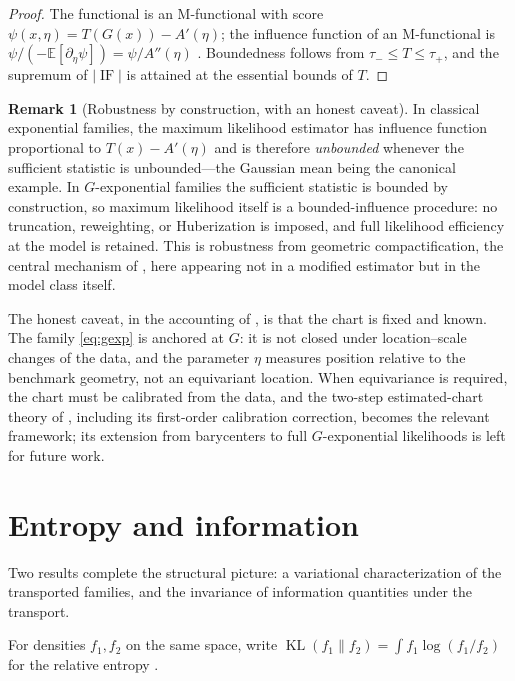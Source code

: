 \documentclass[11pt]{article}
\theoremstyle{definition}
\newtheorem{remark}[theorem]{Remark}
\newcommand{\E}{\mathbb{E}}
\newcommand{\KL}{\operatorname{KL}}
\newcommand{\IF}{\operatorname{IF}}
\begin{document}
\begin{proof}
The functional is an M-functional with score
$\psi(x,\eta)=T(G(x))-A'(\eta)$; the influence function of an M-functional
is $\psi/(-\E[\partial_\eta\psi])=\psi/A''(\eta)$
\cite{HampelEtAl1986,Huber2009}. Boundedness follows from
$\tau_-\le T\le\tau_+$, and the supremum of $|\IF|$ is attained at the
essential bounds of $T$.
\end{proof}

\begin{remark}[Robustness by construction, with an honest caveat]
\label{rem:robustness}
In classical exponential families, the maximum likelihood estimator has
influence function proportional to $T(x)-A'(\eta)$ and is therefore
\emph{unbounded} whenever the sufficient statistic is unbounded---the
Gaussian mean being the canonical example. In $G$-exponential families the
sufficient statistic is bounded by construction, so maximum likelihood
itself is a bounded-influence procedure: no truncation, reweighting, or
Huberization is imposed, and full likelihood efficiency at the model is
retained. This is robustness from geometric compactification, the central
mechanism of \cite{Cojocea2026b}, here appearing not in a modified
estimator but in the model class itself.

The honest caveat, in the accounting of \cite{Cojocea2026b}, is that the
chart is fixed and known. The family \eqref{eq:gexp} is anchored at $G$:
it is not closed under location--scale changes of the data, and the
parameter $\eta$ measures position relative to the benchmark geometry, not
an equivariant location. When equivariance is required, the chart must be
calibrated from the data, and the two-step estimated-chart theory of
\cite{Cojocea2026b}, including its first-order calibration correction,
becomes the relevant framework; its extension from barycenters to full
$G$-exponential likelihoods is left for future work.
\end{remark}

\section{Entropy and information}\label{sec:entropy}

Two results complete the structural picture: a variational
characterization of the transported families, and the invariance of
information quantities under the transport.

For densities $f_1,f_2$ on the same space, write
$\KL(f_1\|f_2)=\int f_1\log(f_1/f_2)$ for the relative entropy
\cite{CoverThomas2006}.
\end{document}

